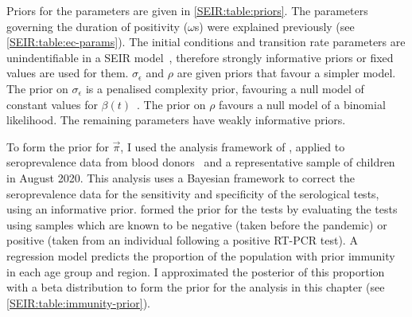 \documentclass[thesis.tex]{subfiles}
\begin{document}
Priors for the parameters are given in \cref{SEIR:table:priors}.
The parameters governing the duration of positivity ($\omega$s) were explained previously (see \cref{SEIR:table:ec-params}).
The initial conditions and transition rate parameters are unindentifiable in a SEIR model~\autocite{dankwaStructural}, therefore strongly informative priors or fixed values are used for them.
$\sigma_\epsilon$ and $\rho$ are given priors that favour a simpler model.
The prior on $\sigma_\epsilon$ is a penalised complexity prior, favouring a null model of constant values for $\beta(t)$~\autocite{simpsonPenalising}.
The prior on $\rho$ favours a null model of a binomial likelihood.
The remaining parameters have weakly informative priors.

To form the prior for $\vec{\pi}$, I used the analysis framework of \textcite{amirthalingamSeroprevalence}, applied to seroprevalence data from blood donors~\autocite{amirthalingamSeroprevalence} and a representative sample of children~\autocite{ratcliffeCommunity} in August 2020.
This analysis uses a Bayesian framework to correct the seroprevalence data for the sensitivity and specificity of the serological tests, using an informative prior.
\Textcite{amirthalingamSeroprevalence} formed the prior for the tests by evaluating the tests using samples which are known to be negative (taken before the pandemic) or positive (taken from an individual following a positive RT-PCR test).
A regression model predicts the proportion of the population with prior immunity in each age group and region.
I approximated the posterior of this proportion with a beta distribution to form the prior for the analysis in this chapter (see \cref{SEIR:table:immunity-prior}).
\end{document}
